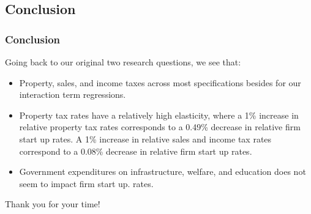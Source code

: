 \documentclass{beamer}
\begin{document}
\begin{frame}
\section{Conclusion}
\frametitle{Conclusion}
Going back to our original two research questions, we see that:
\begin{itemize}
\item Property, sales, and income taxes across most specifications besides for our interaction term regressions. 
\item Property tax rates have a relatively high elasticity, where a 1\% increase in relative property tax rates corresponds to a 0.49\% decrease in relative firm start up rates. A 1\% increase in relative sales and income tax rates correspond to a 0.08\% decrease in relative firm start up rates.
\item Government expenditures on infrastructure, welfare, and education does not seem to impact firm start up. rates.

\end{itemize}
\end{frame}

\begin{frame}
\begin{centering}
\huge{Thank you for your time!}
\end{centering}
\end{frame}
\end{document}
